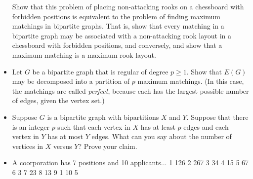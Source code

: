 \begin{itemize}
    Show that this problem of placing non-attacking rooks on a chessboard with forbidden positions is equivalent to the problem of finding maximum matchings in bipartite graphs.  That is, show that every matching in a bipartite graph may be associated with a non-attacking rook layout in a chessboard with forbidden positions, and conversely, and show that a maximum matching is a maximum rook layout.
    \item Let $G$ be a bipartite graph that is regular of degree $p\geq 1$.  Show that $E(G)$ may be decomposed into a partition of $p$ maximum matchings.  (In this case, the matchings are called \textit{perfect}, because each has the largest possible number of edges, given the vertex set.)
    \item Suppose $G$ is a bipartite graph with bipartitions $X$ and $Y$.  Suppose that there is an integer $p$ such that each vertex in $X$ has at least $p$ edges and each vertex in $Y$ has at most $Y$ edges.  What can you say about the number of vertices in $X$ versus $Y$?  Prove your claim.
    \item A coorporation has 7 positions and 10 applicants...
    1 126
    2 267
    3 34
    4 15
    5 67
    6 3
    7 23
    8 13
    9 1
    10 5

\end{itemize}
